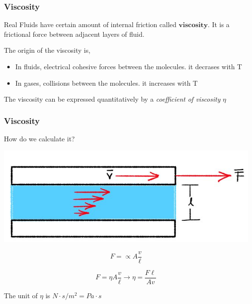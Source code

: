\documentclass[]{beamer}
\begin{document}
\begin{frame}

\frametitle{Viscosity}
Real Fluids have certain amount of internal friction called $\textbf{viscosity}$. 
It is a frictional force between adjacent layers of fluid.
\vspace{3mm}

\pause
The origin of the viscosity is,

\begin{itemize}
\item In fluids, electrical cohesive forces between the molecules. \pause\textcolor{mypink1}{it decrases with T}
\pause
\item In gases, collisions between the molecules. \pause\textcolor{mypink1}{it increases with T}
\end{itemize}
\vspace{3mm}

\pause

The viscosity can be expressed quantitatively by a \textit{coefficient of viscosity} $\eta$


 \end{frame}



\begin{frame}

\frametitle{Viscosity}

\textcolor{mypink1}{How do we calculate it?}
\pause

  \begin{center}
  \includegraphics[height=1.in]{images2/vicosity.jpg}
\end{center}

\pause
\begin{equation}
F=\propto A \frac{v}{\ell} 
\end{equation}

\pause
\begin{equation}
F=\eta A \frac{v}{\ell} \rightarrow \eta=\boxed{\frac{F\ell}{Av} }
\end{equation}
\pause

The unit of $\eta$ is $N\cdot s/m^2=Pa\cdot s$

 \end{frame}
\end{document}
